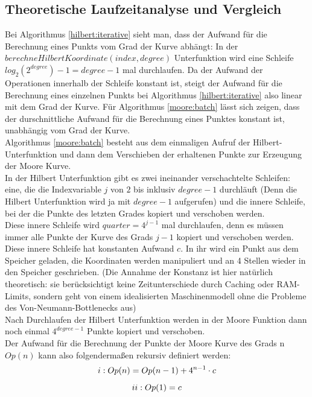 \documentclass[course=erap]{aspdoc}
\newcommand{\uproman}[1]{\uppercase\expandafter{\romannumeral#1}}
\begin{document}
\subsection{Theoretische Laufzeitanalyse und Vergleich}
Bei Algorithmus \ref{hilbert:iterative} sieht man, dass der Aufwand für die Berechnung eines Punkts vom Grad der Kurve abhängt: In der $berechneHilbertKoordinate(index, degree)$ Unterfunktion wird eine Schleife $log_2(2^{degree})-1 = degree -1$ mal durchlaufen. Da der Aufwand der Operationen innerhalb der Schleife konstant ist, steigt der Aufwand für die Berechnung eines einzelnen Punkts bei Algorithmus \ref{hilbert:iterative} also linear mit dem Grad der Kurve.
\newline
Für Algorithmus \ref{moore:batch} lässt sich zeigen, dass der durschnittliche Aufwand für die Berechnung eines Punktes konstant ist, unabhängig vom Grad der Kurve. \\
Algorithmus \ref{moore:batch} besteht aus dem einmaligen Aufruf der Hilbert-Unterfunktion und dann dem Verschieben der erhaltenen Punkte zur Erzeugung der Moore Kurve. \\
In der Hilbert Unterfunktion gibt es zwei ineinander verschachtelte Schleifen: eine, die die Indexvariable $j$ von $2$ bis inklusiv  $degree -1$ durchläuft (Denn die Hilbert Unterfunktion wird ja mit $degree-1$ aufgerufen) und die innere Schleife, bei der die Punkte des letzten Grades kopiert und verschoben werden. \\ 
Diese innere Schleife wird $quarter = 4^{j-1}$ mal durchlaufen, denn es müssen immer alle Punkte der Kurve des Grads $j-1$ kopiert und verschoben werden. Diese innere Schleife hat konstanten Aufwand $c$. In ihr wird ein Punkt aus dem Speicher  geladen, die Koordinaten werden manipuliert und an 4 Stellen wieder in den Speicher geschrieben. (Die Annahme der Konstanz ist hier natürlich theoretisch: sie berücksichtigt keine Zeitunterschiede durch Caching oder RAM-Limits, sondern geht von einem idealisierten Maschinenmodell ohne die Probleme des Von-Neumann-Bottlenecks aus)\\
Nach Durchlaufen der Hilbert Unterfunktion werden in der Moore Funktion dann noch einmal  $4^{degree-1}$ Punkte kopiert und verschoben. \\ Der Aufwand für die Berechnung der Punkte der Moore Kurve des Grads n $Op(n)$ kann also folgendermaßen rekursiv definiert werden: \ \\
\[\uproman{1}: Op(n) = Op(n-1) + 4^{n-1}\cdot c\]
\[\uproman{2}: Op(1) = c\] \ \\ 
\end{document}
